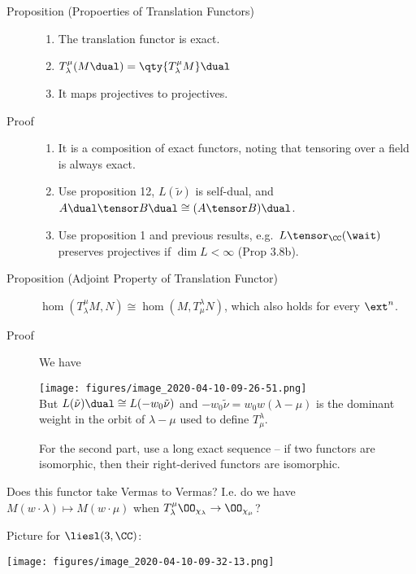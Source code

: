 \begin{description}
\item[Proposition (Propoerties of Translation Functors)]
\hfill

\begin{enumerate}
\def\labelenumi{\arabic{enumi}.}
\tightlist
\item
  The translation functor is exact.
\item
  \(T_\lambda^\mu (M\dual) = \qty{T_\lambda^\mu M}\dual\)
\item
  It maps projectives to projectives.
\end{enumerate}
\item[Proof]
\hfill

\begin{enumerate}
\def\labelenumi{\arabic{enumi}.}
\tightlist
\item
  It is a composition of exact functors, noting that tensoring over a
  field is always exact.
\item
  Use proposition 12, \(L(\tilde \nu)\) is self-dual, and
  \(A\dual \tensor B\dual \cong (A\tensor B)\dual\).
\item
  Use proposition 1 and previous results, e.g.~\(L \tensor_\CC (\wait)\)
  preserves projectives if \(\dim L < \infty\) (Prop 3.8b).
\end{enumerate}
\item[Proposition (Adjoint Property of Translation Functor)]
\(\hom(T_\lambda^\mu M, N) \cong \hom(M, T_\mu^\lambda N)\), which also
holds for every \(\ext^n\).
\item[Proof]
We have

\texttt{[image: figures/image\_2020-04-10-09-26-51.png]}\\

But \(L(\tilde \nu)\dual \cong L(-w_0 \tilde \nu)\) and
\(-w_0 \tilde \nu = w_0 w(\lambda - \mu)\) is the dominant weight in the
orbit of \(\lambda - \mu\) used to define \(T_\mu^\lambda\).

For the second part, use a long exact sequence -- if two functors are
isomorphic, then their right-derived functors are isomorphic.
\end{description}

Does this functor take Vermas to Vermas? I.e. do we have
\(M(w\cdot \lambda) \mapsto M(w\cdot \mu)\) when
\(T_\lambda^\mu \OO_{\chi_\lambda} \to \OO_{\chi_\mu}\)?

Picture for \(\liesl(3, \CC)\):

\texttt{[image: figures/image\_2020-04-10-09-32-13.png]}\\

